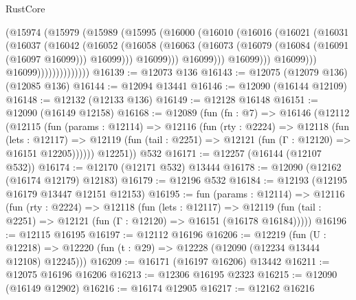 \begin{lexlean}{RustCore}
\begin{coremodule}
                              (@15974
                                (@15979
                                  (@15989
                                    (@15995
                                      (@16000
                                        (@16010
                                          (@16016
                                            (@16021
                                              (@16031
                                                (@16037
                                                  (@16042
                                                    (@16052
                                                      (@16058
                                                        (@16063
                                                          (@16073
                                                            (@16079
                                                              (@16084 (@16091 (@16097 @16099)))
                                                              @16099)))
                                                        @16099)))
                                                  @16099)))
                                            @16099)))
                                      @16099)))
                                @16099))))))))))))))
@16139 := @12073 @136
@16143 := @12075 (@12079 @136) (@12085 @136)
@16144 := @12094 @13441
@16146 := @12090 (@16144 @12109)
@16148 := @12132 (@12133 @136)
@16149 := @12128 @16148
@16151 := @12090 (@16149 @12158)
@16168 := @12089
    (fun (fn : @7) =>
    @16146
      (@12112
        (@12115
          (fun (params : @12114) =>
          @12116
            (fun (rty : @2224) =>
            @12118
              (fun (lets : @12117) =>
              @12119 (fun (tail : @2251) => @12121 (fun (Γ : @12120) => @16151 @12205))))))
        @12251))
    @532
@16171 := @12257 (@16144 (@12107 @532))
@16174 := @12170 (@12171 @532) @13444
@16178 := @12090 (@12162 (@16174 @12179) @12183)
@16179 := @12196 @532
@16184 := @12193 (@12195 @16179 @13447 @12151 @12153)
@16195 := fun (params : @12114) =>
  @12116
    (fun (rty : @2224) =>
    @12118
      (fun (lets : @12117) =>
      @12119 (fun (tail : @2251) => @12121 (fun (Γ : @12120) => @16151 (@16178 @16184)))))
@16196 := @12115 @16195
@16197 := @12112 @16196
@16206 := @12219
    (fun (U : @12218) => @12220 (fun (t : @29) => @12228 (@12090 (@12234 @13444 @12108) @12245)))
@16209 := @16171 (@16197 @16206) @13442
@16211 := @12075 @16196 @16206
@16213 := @12306 @16195 @2323
@16215 := @12090 (@16149 @12902)
@16216 := @16174 @12905
@16217 := @12162 @16216

\end{coremodule}
\end{lexlean}
